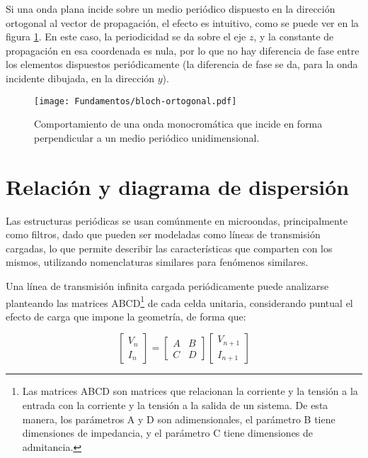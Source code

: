 Si una onda plana incide sobre un medio periódico dispuesto en la dirección ortogonal al vector de propagación, el efecto es intuitivo, como se puede ver en la figura \ref{fig:bloch-ortogonal}. En este caso, la periodicidad se da sobre el eje $z$, y la constante de propagación en esa coordenada es nula, por lo que no hay diferencia de fase entre los elementos dispuestos periódicamente (la diferencia de fase se da, para la onda incidente dibujada, en la dirección $y$).

\begin{figure}[htp]
	\centering
	\texttt{[image: Fundamentos/bloch-ortogonal.pdf]}
	\caption{Comportamiento de una onda monocromática que incide en forma perpendicular a un medio periódico unidimensional.}
	\label{fig:bloch-ortogonal}
\end{figure}


\section{Relación y diagrama de dispersión}
\label{sec:diag-de-dispersion}

Las estructuras periódicas se usan comúnmente en microondas, principalmente como filtros, dado que pueden ser modeladas como líneas de transmisión cargadas, lo que permite describir las características que comparten con los mismos, utilizando nomenclaturas similares para fenómenos similares.

Una línea de transmisión infinita cargada periódicamente puede analizarse planteando las matrices ABCD\footnote{Las matrices ABCD son matrices que relacionan la corriente y la tensión a la entrada con la corriente y la tensión a la salida de un sistema. De esta manera, los parámetros A y D son adimensionales, el parámetro B tiene dimensiones de impedancia, y el parámetro C tiene dimensiones de admitancia.} de cada celda unitaria, considerando puntual el efecto de carga que impone la geometría, de forma que:

\begin{equation}
	\begin{bmatrix}
		V_n \\
		I_n
	\end{bmatrix}
	=
	\begin{bmatrix}
		A & B \\
		C & D
	\end{bmatrix}
	\begin{bmatrix}
		V_{n+1} \\
		I_{n+1}
	\end{bmatrix}
\end{equation}

